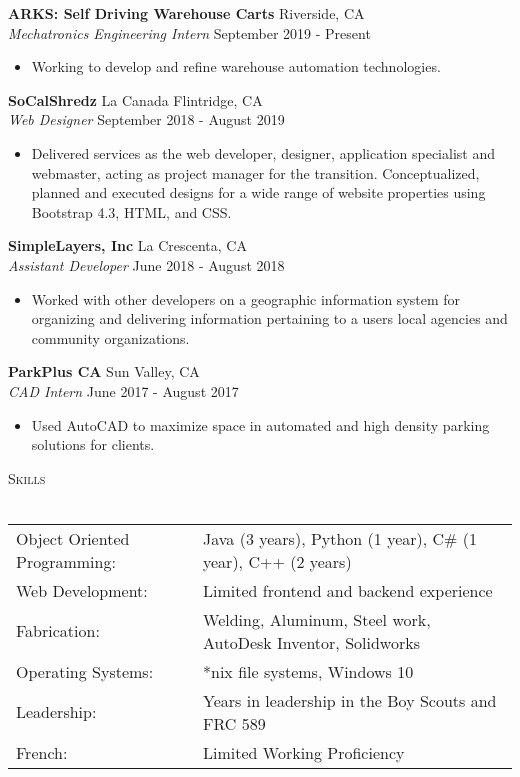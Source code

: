 \documentclass[a4paper]{article}
\newcommand{\lineunder} {
    \vspace*{-8pt} \\
    \hspace*{-18pt} \hrulefill \\
}
\newcommand{\header} [1] {
    {\hspace*{-18pt}\vspace*{6pt} \textsc{#1}}
    \vspace*{-6pt} \lineunder
}
\begin{document}
\textbf{ARKS: Self Driving Warehouse Carts} \hfill Riverside, CA\\
\textit{Mechatronics Engineering Intern} \hfill September 2019 - Present\\
\vspace{-1mm}
\begin{itemize} \itemsep 1pt
	\item Working to develop and refine warehouse automation technologies.
\end{itemize}
\textbf{SoCalShredz} \hfill La Canada Flintridge, CA\\
\textit{Web Designer} \hfill September 2018 - August 2019\\
\vspace{-1mm}
\begin{itemize} \itemsep 1pt
	\item Delivered services as the web developer, designer, application specialist and webmaster, acting as project manager for the transition. Conceptualized, planned and executed designs for a wide range of website properties using Bootstrap 4.3, HTML, and CSS.
\end{itemize}
\textbf{SimpleLayers, Inc} \hfill La Crescenta, CA\\
\textit{Assistant Developer} \hfill June 2018 - August 2018\\
\vspace{-1mm}
\begin{itemize} \itemsep 1pt
	\item Worked with other developers on a geographic information system for organizing and delivering information pertaining to a user\textquotesingle{}s local agencies and community organizations.
\end{itemize}
\textbf{ParkPlus CA} \hfill Sun Valley, CA\\
\textit{CAD Intern} \hfill June 2017 - August 2017\\
\vspace{-1mm}
\begin{itemize} \itemsep 1pt
	\item Used AutoCAD to maximize space in automated and high density parking solutions for clients.
\end{itemize}

\header{Skills}
\begin{tabular}{ l l }
	Object Oriented Programming: & Java (3 years), Python (1 year), C\# (1 year), C++ (2 years) \\
	Web Development:             & Limited frontend and backend experience                      \\
	Fabrication:                 & Welding, Aluminum, Steel work, AutoDesk Inventor, Solidworks \\
	Operating Systems:           & *nix file systems, Windows 10                                \\
	Leadership:                  & Years in leadership in the Boy Scouts and FRC 589            \\
	French:                      & Limited Working Proficiency                                  \\
\end{tabular}
\vspace{2mm}
\end{document}
